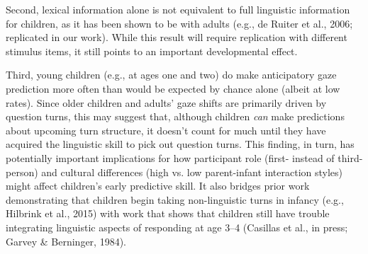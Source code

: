 \documentclass[11pt,a4paper]{letter} %
\begin{document}
\begin{letter}{}
Second, lexical information alone is not equivalent to full linguistic information for children, as it has been shown to be with adults (e.g., de Ruiter et al., 2006; replicated in our work). While this result will require replication with different stimulus items, it still points to an important developmental effect. 

Third, young children (e.g., at ages one and two) do make anticipatory gaze prediction more often than would be expected by chance alone (albeit at low rates). Since older children and adults' gaze shifts are primarily driven by question turns, this may suggest that, although children \textit{can} make predictions about upcoming turn structure, it doesn't count for much until they have acquired the linguistic skill to pick out question turns. This finding, in turn, has potentially important implications for how participant role (first- instead of third-person) and cultural differences (high vs. low parent-infant interaction styles) might affect children's early predictive skill. It also bridges prior work demonstrating that children begin taking non-linguistic turns in infancy (e.g., Hilbrink et al., 2015) with work that shows that children still have trouble integrating linguistic aspects of responding at age 3--4 (Casillas et al., in press; Garvey \& Berninger, 1984).




\end{letter}
\end{document}
